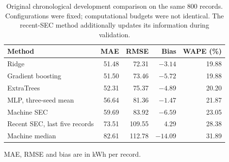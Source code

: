\begin{table}[!htbp]\centering\small
\caption{Original chronological development comparison on the same 800 records. Configurations were fixed; computational budgets were not identical. The recent-SEC method additionally updates its information during validation.}\label{tab:development}
\begin{tabular}{@{}lrrrr@{}}\toprule
Method & MAE & RMSE & Bias & WAPE (\%)\\\midrule
Ridge & 51.48 & 72.31 & $-3.14$ & 19.88\\
Gradient boosting & 51.50 & 73.46 & $-5.72$ & 19.88\\
ExtraTrees & 52.31 & 75.37 & $-4.89$ & 20.20\\
MLP, three-seed mean & 56.64 & 81.36 & $-1.47$ & 21.87\\
Machine SEC & 59.69 & 83.92 & $-6.59$ & 23.05\\
Recent SEC, last five records & 73.51 & 109.55 & 4.29 & 28.38\\
Machine median & 82.61 & 112.78 & $-14.09$ & 31.89\\\bottomrule
\end{tabular}\par\vspace{4pt}\footnotesize MAE, RMSE and bias are in kWh per record.
\end{table}
